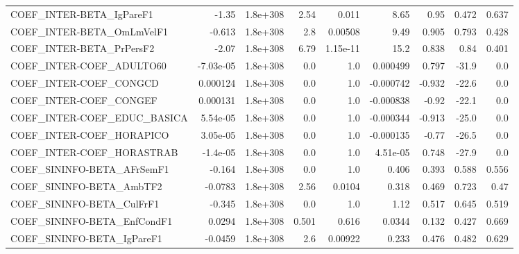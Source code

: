\begin{tabular}{lrrrrrrrr}
COEF\_INTER-BETA\_IgPareF1              &       -1.35 &     1.8e+308 &    2.54 &    0.011 &       8.65 &        0.95 &        0.472 &         0.637 \\
COEF\_INTER-BETA\_OmLmVelF1             &      -0.613 &     1.8e+308 &     2.8 &  0.00508 &       9.49 &       0.905 &        0.793 &         0.428 \\
COEF\_INTER-BETA\_PrPersF2              &       -2.07 &     1.8e+308 &    6.79 & 1.15e-11 &       15.2 &       0.838 &         0.84 &         0.401 \\
COEF\_INTER-COEF\_ADULTO60              &   -7.03e-05 &     1.8e+308 &     0.0 &      1.0 &   0.000499 &       0.797 &        -31.9 &           0.0 \\
COEF\_INTER-COEF\_CONGCD                &    0.000124 &     1.8e+308 &     0.0 &      1.0 &  -0.000742 &      -0.932 &        -22.6 &           0.0 \\
COEF\_INTER-COEF\_CONGEF                &    0.000131 &     1.8e+308 &     0.0 &      1.0 &  -0.000838 &       -0.92 &        -22.1 &           0.0 \\
COEF\_INTER-COEF\_EDUC\_BASICA           &    5.54e-05 &     1.8e+308 &     0.0 &      1.0 &  -0.000344 &      -0.913 &        -25.0 &           0.0 \\
COEF\_INTER-COEF\_HORAPICO              &    3.05e-05 &     1.8e+308 &     0.0 &      1.0 &  -0.000135 &       -0.77 &        -26.5 &           0.0 \\
COEF\_INTER-COEF\_HORASTRAB             &    -1.4e-05 &     1.8e+308 &     0.0 &      1.0 &   4.51e-05 &       0.748 &        -27.9 &           0.0 \\
COEF\_SININFO-BETA\_AFrSemF1            &      -0.164 &     1.8e+308 &     0.0 &      1.0 &      0.406 &       0.393 &        0.588 &         0.556 \\
COEF\_SININFO-BETA\_AmbTF2              &     -0.0783 &     1.8e+308 &    2.56 &   0.0104 &      0.318 &       0.469 &        0.723 &          0.47 \\
COEF\_SININFO-BETA\_CulFrF1             &      -0.345 &     1.8e+308 &     0.0 &      1.0 &       1.12 &       0.517 &        0.645 &         0.519 \\
COEF\_SININFO-BETA\_EnfCondF1           &      0.0294 &     1.8e+308 &   0.501 &    0.616 &     0.0344 &       0.132 &        0.427 &         0.669 \\
COEF\_SININFO-BETA\_IgPareF1            &     -0.0459 &     1.8e+308 &     2.6 &  0.00922 &      0.233 &       0.476 &        0.482 &         0.629 \\

\end{tabular}
